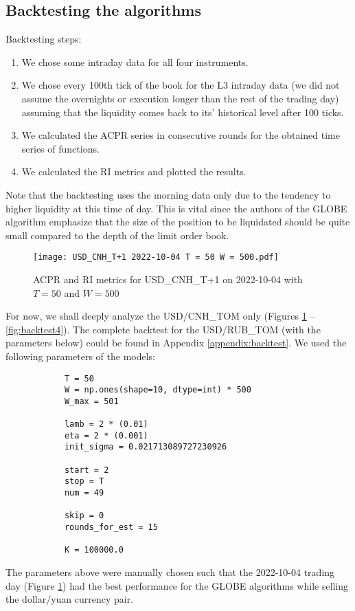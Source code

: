     \subsection{Backtesting the algorithms}\label{section:backtest}
        Backtesting steps:
        \begin{enumerate}
            \item We chose some intraday data for all four instruments.
            \item We chose every 100th tick of the book for the L3 intraday data (we did not assume the overnights or execution
                  longer than the rest of the trading day) assuming that the liquidity comes back to its' historical level after 100 ticks.
            \item We calculated the ACPR series in consecutive rounds for the obtained time series of functions.
            \item We calculated the RI metrics and plotted the results.
        \end{enumerate}
        Note that the backtesting uses the morning data only due to the tendency to higher liquidity at this time of day. 
        This is vital since the authors of the GLOBE algorithm emphasize that the size of the position to be liquidated should be quite small 
        compared to the depth of the limit order book.

        \begin{figure}[htbp]
            \texttt{[image: USD\_CNH\_T+1 2022-10-04 T = 50 W = 500.pdf]}
            \caption{ACPR and RI metrics for USD\_CNH\_T+1 on 2022-10-04 with $T = 50$ and $W = 500$}\label{fig:backtest1}
        \end{figure}

        For now, we shall deeply analyze the USD/CNH\_TOM only (Figures \ref{fig:backtest1} -- \ref{fig:backtest4}). The complete backtest 
        for the USD/RUB\_TOM (with the parameters below) could be found in Appendix \ref{appendix:backtest}.
        We used the following parameters of the models:
        \begin{verbatim}
            T = 50
            W = np.ones(shape=10, dtype=int) * 500
            W_max = 501

            lamb = 2 * (0.01)
            eta = 2 * (0.001)
            init_sigma = 0.021713089727230926

            start = 2
            stop = T
            num = 49

            skip = 0
            rounds_for_est = 15

            K = 100000.0
        \end{verbatim}
        The parameters above were manually chosen such that the 2022-10-04 trading day (Figure \ref{fig:backtest1}) had the best performance 
        for the GLOBE algorithms while selling the dollar/yuan currency pair.
        
